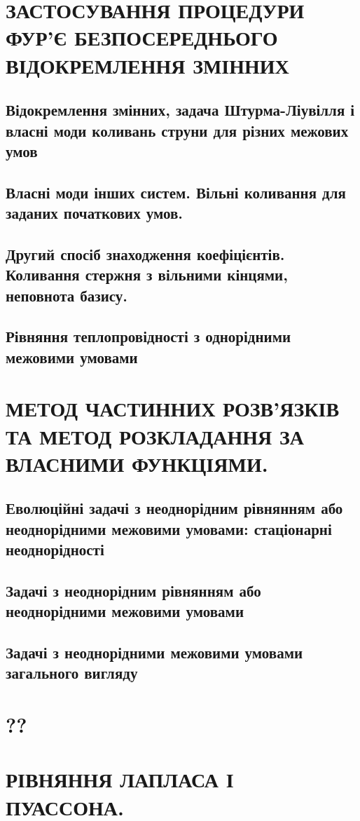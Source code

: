 \documentclass[a4paper, 14pt]{extreport}
\begin{document}
\tableofcontents
\setcounter{page}{2}

\part{ЗАСТОСУВАННЯ ПРОЦЕДУРИ ФУР’Є БЕЗПОСЕРЕДНЬОГО ВІДОКРЕМЛЕННЯ ЗМІННИХ}

\chapter{Відокремлення змінних, задача Штурма-Ліувілля і власні моди коливань струни для різних межових умов}
%

\chapter{Власні моди інших систем. Вільні коливання для заданих початкових умов.}
%
%

\chapter{Другий спосіб знаходження коефіцієнтів. Коливання стержня з вільними кінцями, неповнота базису.}
%
%

\chapter{Рівняння теплопровідності з однорідними межовими умовами}
%
%
%

\part{МЕТОД ЧАСТИННИХ РОЗВ’ЯЗКІВ ТА МЕТОД РОЗКЛАДАННЯ ЗА ВЛАСНИМИ ФУНКЦІЯМИ.}

\chapter{Еволюційні задачі з неоднорідним рівнянням або неоднорідними межовими умовами: стаціонарні неоднорідності}
%
%

\chapter{Задачі з неоднорідним рівнянням або неоднорідними межовими умовами}
%
%

\chapter{Задачі з неоднорідними межовими умовами загального вигляду}
%
%


\part{??}

\part{РІВНЯННЯ ЛАПЛАСА І ПУАССОНА.}
\end{document}
